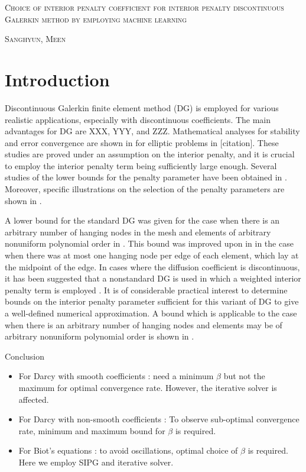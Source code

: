 \documentclass[11pt]{article}
\begin{document}
\begin{center}
{\Large{\textsc{
Choice of interior penalty coefficient for interior penalty discontinuous Galerkin method by employing machine learning}
}
}
\end{center}


\begin{center}
{{\textsc{
Sanghyun, Meen}
}
}
\end{center}

\section{Introduction}

Discontinuous Galerkin finite element method (DG) is employed for various realistic applications, especially with discontinuous coefficients. The main advantages for DG are XXX, YYY, and ZZZ. Mathematical analyses for stability and error convergence are shown in for elliptic problems in [citation]. 
These studies are proved under an assumption on the interior penalty, and it is   crucial to employ the interior penalty term being sufficiently large enough. 
Several studies of the lower bounds for the penalty parameter have been obtained in \cite{ainsworth2007posteriori,ainsworth2010fully,ainsworth2009constant,epshteyn2007estimation,shahbazi2005explicit}. Moreover, specific illustrations on the selection of the penalty parameters are shown in \cite{ainsworth2012note}.


A lower bound for the standard DG was given for the case when there is an arbitrary number of hanging nodes in the mesh and elements of arbitrary nonuniform polynomial order in \cite{shahbazi2005explicit}.
This bound was improved upon in \cite{ainsworth2009constant} in the case when there was at most one hanging node per edge of each element, which lay at the midpoint of the edge. 
In cases where the diffusion coefficient is discontinuous, it has been suggested that a nonstandard DG is used in which a weighted interior penalty term is employed \cite{ern2008posteriori,ern2009discontinuous}. 
It is of considerable practical interest to
determine bounds on the interior penalty parameter sufficient for this variant of DG to give
a well-defined numerical approximation. 
A bound which is
applicable to the case when there is an arbitrary number of hanging nodes and elements may be of arbitrary nonuniform polynomial order is shown in  \cite{ainsworth2012note}.


Conclusion
\begin{itemize}
\item For Darcy with smooth coefficients : need a minimum $\beta$ but not the maximum for optimal convergence rate. However, the iterative solver is affected.
\item For Darcy with non-smooth coefficients : To observe sub-optimal convergence rate, minimum and maximum bound for $\beta$ is required. 
\item For Biot's equations : to avoid oscillations, optimal choice of $\beta$ is required. Here we employ SIPG and iterative solver. 
\end{itemize}
\end{document}
